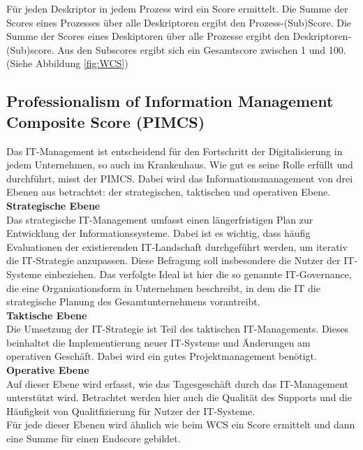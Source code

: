 	Für jeden Deskriptor in jedem Prozess wird ein Score ermittelt. Die Summe der Scores eines Prozesses über alle Deskriptoren ergibt den Prozess-(Sub)Score. Die Summe der Scores eines Deskiptoren über alle Prozesse ergibt den Deskriptoren-(Sub)score. Aus den Subscores ergibt sich ein Gesamtscore zwischen 1 und 100. (Siehe Abbildung \ref{fig:WCS})
\subsection{Professionalism of Information Management Composite Score (PIMCS)}
	Das IT-Management ist entscheidend für den Fortschritt der Digitalisierung in jedem Unternehmen, so auch im Krankenhaus. Wie gut es seine Rolle erfüllt und durchführt, misst der PIMCS. Dabei wird das Informationsmanagement von drei Ebenen aus betrachtet: der strategischen, taktischen und operativen Ebene. \parencite{huebner2019}
	\vspace{\parheadvspace}\\
	\textbf{Strategische Ebene}\\
	Das strategische IT-Management umfasst einen längerfristigen Plan zur Entwicklung der Informationssysteme. Dabei ist es wichtig, dass häufig Evaluationen der existierenden IT-Landschaft durchgeführt werden, um iterativ die IT-Strategie anzupassen. Diese Befragung soll insbesondere die Nutzer der IT-Systeme einbeziehen. Das verfolgte Ideal ist hier die so genannte IT-Governance, die eine Organisationsform in Unternehmen beschreibt, in dem die IT die strategische Planung des Gesamtunternehmens vorantreibt.
	\vspace{\parheadvspace}\\
	\textbf{Taktische Ebene}\\
	Die Umsetzung der IT-Strategie ist Teil des taktischen IT-Managements. Dieses beinhaltet die Implementierung neuer IT-Systeme und Änderungen am operativen Geschäft. Dabei wird ein gutes Projektmanagement benötigt.
	\vspace{\parheadvspace}\\
	\textbf{Operative Ebene}\\
	Auf dieser Ebene wird erfasst, wie das Tagesgeschäft durch das IT-Management unterstützt wird. Betrachtet werden hier auch die Qualität des Supports und die Häufigkeit von Qualitfizierung für Nutzer der IT-Systeme.\\

	Für jede dieser Ebenen wird ähnlich wie beim WCS ein Score ermittelt und dann eine Summe für einen Endscore gebildet. \parencite{huebner2019}
